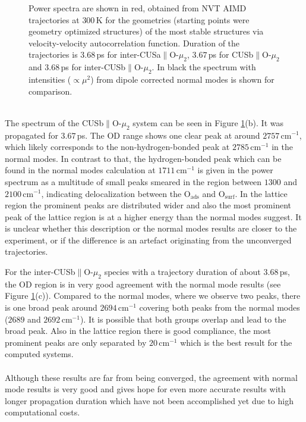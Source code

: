 \documentclass[11pt,DIV=13,BCOR=5mm,a4paper,headinclude]{scrbook}
\begin{document}
\begin{figure}[!h]
             \caption{Power spectra are shown in red, obtained from NVT AIMD trajectories at $300\,$K for the geometries (starting points were geometry optimized structures) of the most stable structures via velocity-velocity autocorrelation function.
Duration of the trajectories is $3.68\,$ps for inter-CUSa$\parallel$O-$\mu_2$, $3.67\,$ps for CUSb$\parallel$O-$\mu_2$ and $3.68\,$ps for inter-CUSb$\parallel$O-$\mu_2$.
In black the spectrum with intensities ($\propto\mu^2$) from dipole corrected normal modes is shown for comparison.}
            \label{abb:velvel_ads_spec}
\end{figure}
\\

The spectrum of the CUSb$\parallel$O-$\mu_2$ system can be seen in Figure \ref{abb:velvel_ads_spec}(b).
It was propagated for $3.67\,$ps.
The OD range shows one clear peak at around $2757\,$cm$^{-1}$, which likely corresponds to the non-hydrogen-bonded peak at $2785\,$cm$^{-1}$ in the normal modes.
In contrast to that, the hydrogen-bonded peak which can be found in the normal modes calculation at $1711\,$cm$^{-1}$ is given in the power spectrum as a multitude of small peaks smeared in the region between $1300$ and $2100\,$cm$^{-1}$, indicating delocalization between the O$_\textrm{ads}$ and O$_\textrm{surf}$.
In the lattice region the prominent peaks are distributed wider and also the most prominent peak of the lattice region is at a higher energy than the normal modes suggest.
It is unclear whether this description or the normal modes results are closer to the experiment, or if the difference is an artefact originating from the unconverged trajectories.


For the inter-CUSb$\parallel$O-$\mu_2$ species with a trajectory duration of about $3.68\,$ps, the OD region is in very good agreement with the normal mode results (see Figure \ref{abb:velvel_ads_spec}(c)).
Compared to the normal modes, where we observe two peaks, there is one broad peak around $2694\,$cm$^{-1}$ covering both peaks from the normal modes ($2689$ and $2692\,$cm$^{-1}$).
It is possible that both groups overlap and lead to the broad peak.
Also in the lattice region there is good compliance, the most prominent peaks are only separated by $20\,$cm$^{-1}$ which is the best result for the computed systems.
\\
\\

Although these results are far from being converged, the agreement with normal mode results is very good and gives hope for even more accurate results with longer propagation duration which have not been accomplished yet due to high computational costs.
\end{document}
